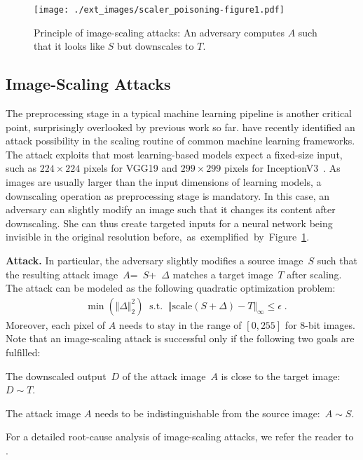 \documentclass[conference]{IEEEtran}
\renewcommand{\paragraph}[1]{{\vskip 8pt \noindent\bf #1 }}
\newcommand{\srcimg}{\ensuremath{S}\xspace}
\newcommand{\tarimg}{\ensuremath{T}\xspace}
\newcommand{\attimg}{\ensuremath{A}\xspace}
\newcommand{\outimg}{\ensuremath{D}\xspace}
\newcommand{\deltaS}{\ensuremath{\Delta}\xspace}
\newcommand{\scalefunc}{\ensuremath{\mathrm{scale}}}
\newcommand{\goalA}{O1\xspace} \newcommand{\goalB}{O2\xspace}
\begin{document}
\begin{figure}[t]
	\centering
	\texttt{[image: ./ext\_images/scaler\_poisoning-figure1.pdf]}
	\vspace{-0.5em}
	\caption{Principle of image-scaling attacks: An
		adversary computes \attimg such that it looks like \srcimg but
		downscales to \tarimg.}
	\label{fig:attack_example}
\end{figure}

\subsection{Image-Scaling Attacks}
\label{subsec:scalingattacksbackground}
The preprocessing stage in a typical machine learning pipeline
is another critical point, surprisingly overlooked by previous 
work so far. \citet{XiaCheShe+19} have recently identified an attack 
possibility in the scaling routine of common machine learning 
frameworks. The attack exploits that most learning-based {models\EndAccSupp{}} {expect\EndAccSupp{}} 
a fixed-size input, such as $224 \times 224$ pixels for 
VGG19 and $299 \times 299$ pixels for 
InceptionV3~\citep{SimZis14,SzeVanIof+15}.
As images are usually larger than the input dimensions of learning 
{models\EndAccSupp{}}, a downscaling operation as preprocessing stage is mandatory. 
In this case, an adversary can slightly modify an image such that it 
changes its content after downscaling. She can thus create targeted 
inputs for a neural network being invisible in the original 
resolution before,~as~exemplified~by~Figure~\ref{fig:attack_example}.

\paragraph{Attack.}
In particular, the adversary slightly modifies a source image~\srcimg 
such that the resulting attack image~\mbox{\attimg = \srcimg + \deltaS} 
matches a target image~\tarimg after scaling. The attack can be {modeled\EndAccSupp{}} 
as the following quadratic optimization problem:
\begin{align}
&\min ( \Vert \deltaS \Vert_2^2 ) \; \;
\mathrm{s.t.} \; \; \Vert \scalefunc(\srcimg + \deltaS) - \tarimg
\Vert_{\infty} \leqslant \epsilon  \; .
\label{eq:opti_problem_basic}
\end{align}
Moreover, each pixel of \attimg needs to stay in the range of 
$[0,255]$ for 8-bit images. 
Note that an image-scaling attack is successful only if the 
following two goals are fulfilled:
\begin{description}[leftmargin=!,labelwidth=\widthof{\textit{(O2)}}]
	\item[\textit{(\goalA)}] The downscaled output~\outimg of the 
	attack image~\attimg is close to 
	the target image:  $\outimg \sim \tarimg $.
	\item[\textit{(\goalB)}]
	The attack image \attimg needs to be indistinguishable from the 
	source image:~\mbox{$\attimg \sim \srcimg$}.
\end{description}
For a detailed root-cause analysis of image-scaling attacks, we refer 
the reader to \citet{QuiKleArp20}.
\end{document}
